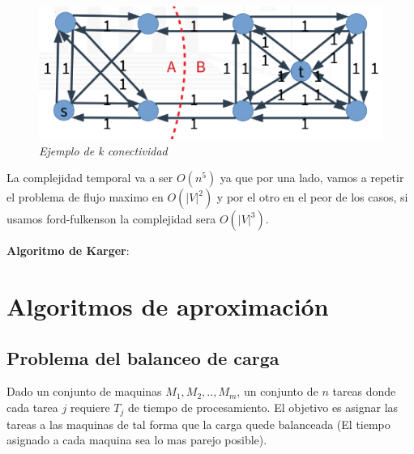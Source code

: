 \documentclass{article}
\begin{document}
\begin{figure}[h!]
    \begin{center} 
    \includegraphics[scale=0.5]{imagenes/ejemplo-k-mincut.png}
    \caption{\small \sl Ejemplo de k conectividad} 
    \end{center}
\end{figure}

La complejidad temporal va a ser \(O(n^5)\) ya que por una lado, vamos a repetir el problema de flujo maximo en \(O(|V|^2)\)
y por el otro en el peor de los casos, si usamos ford-fulkenson la complejidad sera \(O(|V|^3)\).

\textbf{Algoritmo de Karger}:


\newpage
\section{Algoritmos de aproximación}

\subsection{Problema del balanceo de carga}

Dado un conjunto de maquinas \(M_1,M_2,..,M_m\), un conjunto de \(n\) tareas donde cada tarea \(j\)
requiere \(T_j\) de tiempo de procesamiento. El objetivo es asignar las tareas a las maquinas
de tal forma que la carga quede balanceada (El tiempo asignado a cada maquina sea lo mas parejo posible).
\end{document}
